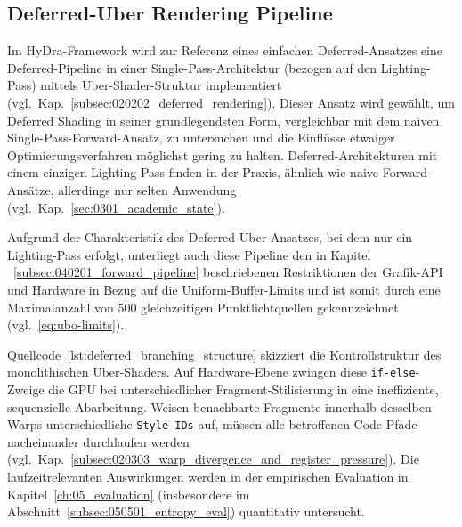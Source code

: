 \subsection{Deferred-Uber Rendering Pipeline}
\label{subsec:040202_deferred_uber_pipeline}

Im \ac{HyDra}-Framework wird zur Referenz eines einfachen Deferred-Ansatzes eine Deferred-Pipeline in einer
Single-Pass-Architektur (bezogen auf den Lighting-Pass) mittels Uber-Shader-Struktur implementiert
(vgl.\ Kap.~\ref{subsec:020202_deferred_rendering}).
Dieser Ansatz wird gewählt, um Deferred Shading in seiner grundlegendsten Form, vergleichbar mit dem naiven
Single-Pass-Forward-Ansatz, zu untersuchen und die Einflüsse etwaiger Optimierungsverfahren möglichst gering zu halten.
Deferred-Architekturen mit einem einzigen Lighting-Pass finden in der Praxis, ähnlich
wie naive Forward-Ansätze, allerdings nur selten Anwendung (vgl.\ Kap.~\ref{sec:0301_academic_state}).

Aufgrund der Charakteristik des Deferred-Uber-Ansatzes, bei dem nur ein Lighting-Pass erfolgt, unterliegt auch diese
Pipeline den in Kapitel ~\ref{subsec:040201_forward_pipeline} beschriebenen Restriktionen der Grafik-\ac{API} und
Hardware in Bezug auf die Uniform-Buffer-Limits und ist somit durch eine Maximalanzahl von 500 gleichzeitigen
Punktlichtquellen gekennzeichnet (vgl.~\ref{eq:ubo-limits}).

Quellcode~\ref{lst:deferred_branching_structure} skizziert die Kontrollstruktur des monolithischen Uber-Shaders.
Auf Hardware-Ebene zwingen diese \texttt{if-else}-Zweige die \ac{GPU} bei unterschiedlicher Fragment-Stilisierung in
eine ineffiziente, sequenzielle Abarbeitung.
Weisen benachbarte Fragmente innerhalb desselben Warps unterschiedliche \texttt{Style-IDs} auf, müssen alle betroffenen
Code-Pfade nacheinander durchlaufen werden~\parencite[vgl.][S.~32]{akenine-mollerRealtimeRendering2019}
(vgl.\ Kap.~\ref{subsec:020303_warp_divergence_and_register_pressure}).
Die laufzeitrelevanten Auswirkungen werden in der empirischen Evaluation in Kapitel~\ref{ch:05_evaluation}
(insbesondere im Abschnitt~\ref{subsec:050501_entropy_eval}) quantitativ untersucht.


